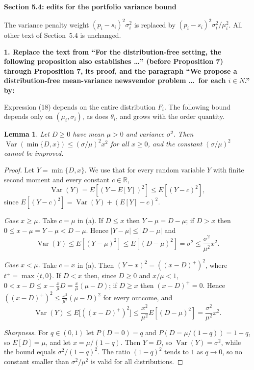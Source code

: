 \documentclass[11pt]{article}
\newtheorem{lemma}{Lemma}
\newcommand{\Var}{\operatorname{Var}}
\newcommand{\edit}[1]{\par\medskip\noindent\colorbox{gray!12}{\parbox{\dimexpr\linewidth-2\fboxsep}{\small\textbf{#1}}}\par\smallskip}
\begin{document}
\begin{center}\large\bf Section 5.4: edits for the portfolio variance bound\end{center}

The variance penalty weight $(p_i-s_i)^2\sigma_i^2$ is replaced by
$(p_i-s_i)^2\sigma_i^2/\mu_i^2$. All other text of Section~5.4 is unchanged.

\edit{1. Replace the text from ``For the distribution-free setting, the following
proposition also establishes \ldots'' (before Proposition 7) through Proposition 7,
its proof, and the paragraph ``We propose a distribution-free mean-variance
newsvendor problem \ldots\ for each $i\in N$.'' by:}

Expression (18) depends on the entire distribution $F_i$. The following bound
depends only on $(\mu_i,\sigma_i)$, as does $\theta_i$, and grows with the order
quantity.

\begin{lemma}\label{lem:cv}
Let $D\ge0$ have mean $\mu>0$ and variance $\sigma^2$. Then
$\Var(\min\{D,x\})\le(\sigma/\mu)^2x^2$ for all $x\ge0$, and the constant
$(\sigma/\mu)^2$ cannot be improved.
\end{lemma}

\begin{proof}
Let $Y=\min\{D,x\}$. We use that for every random variable $Y$ with finite second
moment and every constant $c\in\mathbb R$,
\[
\Var(Y)=E[(Y-E[Y])^2]\le E[(Y-c)^2], \tag{a}
\]
since $E[(Y-c)^2]=\Var(Y)+(E[Y]-c)^2$.

\emph{Case $x\ge\mu$.} Take $c=\mu$ in (a). If $D\le x$ then $Y-\mu=D-\mu$; if
$D>x$ then $0\le x-\mu=Y-\mu<D-\mu$. Hence $|Y-\mu|\le|D-\mu|$ and
\[
\Var(Y)\le E[(Y-\mu)^2]\le E[(D-\mu)^2]=\sigma^2\le\frac{\sigma^2}{\mu^2}x^2 .
\]

\emph{Case $x<\mu$.} Take $c=x$ in (a). Then $(Y-x)^2=((x-D)^+)^2$, where
$t^+=\max\{t,0\}$. If $D<x$ then, since $D\ge0$ and $x/\mu<1$,
$0<x-D\le x-\tfrac{x}{\mu}D=\tfrac{x}{\mu}(\mu-D)$; if $D\ge x$ then $(x-D)^+=0$.
Hence $((x-D)^+)^2\le\tfrac{x^2}{\mu^2}(\mu-D)^2$ for every outcome, and
\[
\Var(Y)\le E\big[((x-D)^+)^2\big]\le\frac{x^2}{\mu^2}E[(D-\mu)^2]=\frac{\sigma^2}{\mu^2}x^2 .
\]

\emph{Sharpness.} For $q\in(0,1)$ let $P(D=0)=q$ and $P(D=\mu/(1-q))=1-q$, so
$E[D]=\mu$, and let $x=\mu/(1-q)$. Then $Y=D$, so $\Var(Y)=\sigma^2$, while the
bound equals $\sigma^2/(1-q)^2$. The ratio $(1-q)^2$ tends to $1$ as $q\to0$, so no
constant smaller than $\sigma^2/\mu^2$ is valid for all distributions.
\end{proof}
\end{document}
